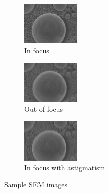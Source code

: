 \documentclass{article}
\begin{document}
\begin{figure}
    \centering
    \begin{subfigure}{\textwidth}
        \centering
        \includegraphics[width=0.3\textwidth]{Images/A in focus.jpg}
        \caption{In focus}
        \label{A in focus}
    \end{subfigure}
    \begin{subfigure}{\textwidth}
        \centering
        \includegraphics[width=0.3\textwidth]{Images/A out of focus.jpg}
        \caption{Out of focus}
        \label{A out of focus}
    \end{subfigure}
    \begin{subfigure}{\textwidth}
        \centering
        \includegraphics[width=0.3\textwidth]{Images/A astigmatism.jpg}
        \caption{In focus with astigmatism}
        \label{A astigmatism}
    \end{subfigure}
    \caption{Sample SEM images}
    \label{Sample SEM images}
\end{figure}
\end{document}
